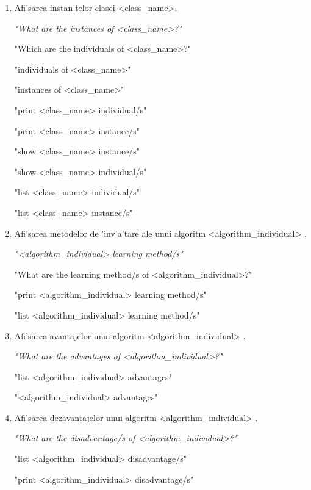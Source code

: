 \begin{enumerate}
    \item Afi'sarea instan'telor clasei <class\_name>. 
    
    {\it
    "What are the instances of <class\_name>?"
    
    "Which are the individuals of <class\_name>?"
    
    "individuals of <class\_name>"
    
    "instances of <class\_name>"
    
    "print <class\_name> individual/s"
    
    "print <class\_name> instance/s" 
    
    "show <class\_name> instance/s"
    
    "show <class\_name> individual/s"
    
    "list <class\_name> individual/s"
    
    "list <class\_name> instance/s"
    }

\item Afi'sarea metodelor de 'inv'a'tare ale unui algoritm <algorithm\_individual> .

{\it
    "<algorithm\_individual> learning method/s"
    
    "What are the learning method/s of <algorithm\_individual>?"
    
    "print <algorithm\_individual> learning method/s"
    
    "list <algorithm\_individual> learning method/s"

}

\item Afi'sarea avantajelor unui algoritm <algorithm\_individual> .

{\it
    "What are the advantages of <algorithm\_individual>?"
    
    "list <algorithm\_individual> advantages"
    
    "<algorithm\_individual> advantages"
}

\item Afi'sarea dezavantajelor unui algoritm <algorithm\_individual> .

{\it
    "What are the disadvantage/s of <algorithm\_individual>?"
    
    "list <algorithm\_individual> disadvantage/s"
    
    "print <algorithm\_individual> disadvantage/s"
    
}
\end{enumerate}
